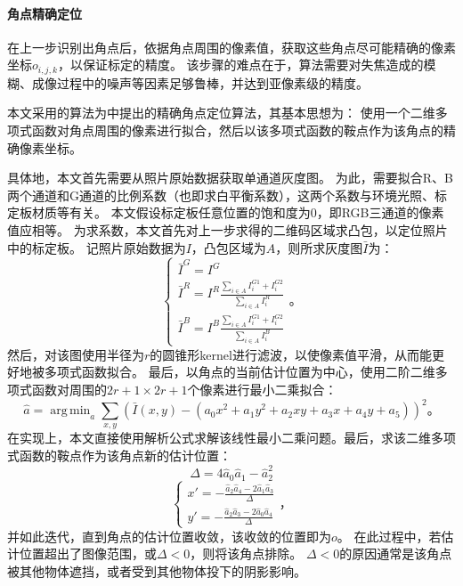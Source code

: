 \documentclass{scutmaster}
\DeclareMathOperator*{\argmin}{arg\,min}
\begin{document}
\paragraph{角点精确定位}在上一步识别出角点后，依据角点周围的像素值，获取这些角点尽可能精确的像素坐标$o_{i,j,k}$，以保证标定的精度。
该步骤的难点在于，算法需要对失焦造成的模糊、成像过程中的噪声等因素足够鲁棒，并达到亚像素级的精度。

本文采用的算法为\cite{ROCHADE}中提出的精确角点定位算法，其基本思想为：
使用一个二维多项式函数对角点周围的像素进行拟合，然后以该多项式函数的鞍点作为该角点的精确像素坐标。

具体地，本文首先需要从照片原始数据获取单通道灰度图。
为此，需要拟合R、B两个通道和G通道的比例系数（也即求白平衡系数），这两个系数与环境光照、标定板材质等有关。
本文假设标定板任意位置的饱和度为0，即RGB三通道的像素值应相等。
为求系数，本文首先对上一步求得的二维码区域求凸包，以定位照片中的标定板。
记照片原始数据为$I$，凸包区域为$A$，则所求灰度图$\bar{I}$为：
\begin{equation}
    \label{eq:wb}
    \begin{cases}
        \bar{I}^G = I^G \\
        \bar{I}^R = I^R \frac{\sum_{i\in A}{I^{G1}_i + I^{G2}_i}}{\sum_{i\in A}{I^R_i}} \\
        \bar{I}^B = I^B \frac{\sum_{i\in A}{I^{G1}_i + I^{G2}_i}}{\sum_{i\in A}{I^B_i}}
    \end{cases}\text{。}
\end{equation}
然后，对该图使用半径为$r$的圆锥形kernel进行滤波，以使像素值平滑，从而能更好地被多项式函数拟合。
最后，以角点的当前估计位置为中心，使用二阶二维多项式函数对周围的$2r+1 \times 2r+1$个像素进行最小二乘拟合：
\begin{equation}
    \label{eq:poly}
    \hat{a} = \argmin_{a} \sum_{x,y} \left(\bar{I}(x, y) - (a_0 x^2 + a_1 y^2 + a_2 xy + a_3 x + a_4 y + a_5)\right)^2\text{。}
\end{equation}
在实现上，本文直接使用解析公式求解该线性最小二乘问题。最后，求该二维多项式函数的鞍点作为该角点新的估计位置：
\begin{equation*}
    \Delta = 4 \hat{a}_0 \hat{a}_1 - \hat{a}_2^2
\end{equation*}
\begin{equation}
    \label{eq:subpixel}
    \begin{cases}
        x' = -\frac{\hat{a}_2 \hat{a}_4 - 2 \hat{a}_1 \hat{a}_3}{\Delta} \\
        y' = -\frac{\hat{a}_2 \hat{a}_3 - 2 \hat{a}_0 \hat{a}_4}{\Delta}
    \end{cases}\text{，}
\end{equation}
并如此迭代，直到角点的估计位置收敛，该收敛的位置即为$o$。
在此过程中，若估计位置超出了图像范围，或$\Delta < 0$，则将该角点排除。
$\Delta < 0$的原因通常是该角点被其他物体遮挡，或者受到其他物体投下的阴影影响。
\end{document}
